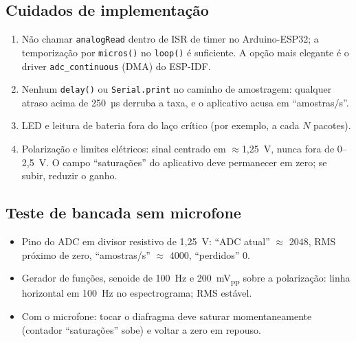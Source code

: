 \documentclass[conference,a4paper]{IEEEtran}
\newcommand{\code}[1]{\texttt{#1}}
\begin{document}
\subsection{Cuidados de implementação}
\begin{enumerate}[leftmargin=*]
\item Não chamar \code{analogRead} dentro de ISR de timer no Arduino-ESP32; a temporização por \code{micros()} no \code{loop()} é suficiente. A opção mais elegante é o driver \code{adc\_continuous} (DMA) do ESP-IDF.
\item Nenhum \code{delay()} ou \code{Serial.print} no caminho de amostragem: qualquer atraso acima de 250~µs derruba a taxa, e o aplicativo acusa em ``amostras/s''.
\item LED e leitura de bateria fora do laço crítico (por exemplo, a cada $N$ pacotes).
\item Polarização e limites elétricos: sinal centrado em $\approx$1,25~V, nunca fora de 0--2,5~V. O campo ``saturações'' do aplicativo deve permanecer em zero; se subir, reduzir o ganho.
\end{enumerate}

\subsection{Teste de bancada sem microfone}
\begin{itemize}[leftmargin=*]
\item Pino do ADC em divisor resistivo de 1,25~V: ``ADC atual'' $\approx$ 2048, RMS próximo de zero, ``amostras/s'' $\approx$ 4000, ``perdidos'' 0.
\item Gerador de funções, senoide de 100~Hz e 200~mV\textsubscript{pp} sobre a polarização: linha horizontal em 100~Hz no espectrograma; RMS estável.
\item Com o microfone: tocar o diafragma deve saturar momentaneamente (contador ``saturações'' sobe) e voltar a zero em repouso.
\end{itemize}
\end{document}
